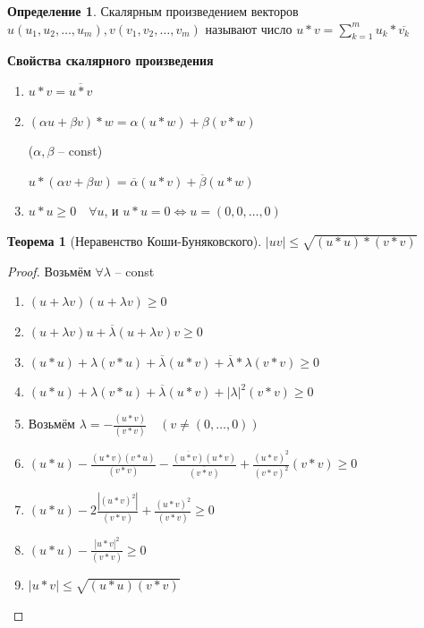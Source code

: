 \documentclass[a4paper,oneside]{article}
\newtheorem{theorem}{Теорема}[subsection]
\theoremstyle{definition}
\newtheorem{definition}{Определение}[subsection]
\theoremstyle{definition}
\theoremstyle{definition}
\begin{document}
\begin{definition}
    Скалярным произведением векторов $u(u_1, u_2, \dots, u_m), v(v_1, v_2, \dots, v_m)$
    называют число $u * v = \displaystyle\sum_{k = 1}^{m} u_k * \overline{v_k}$
\end{definition}

\textbf{Свойства скалярного произведения}
\begin{enumerate}
    \item $u * v = \overline{u * v}$
    \item $(\alpha u + \beta v) * w = \alpha (u * w) + \beta (v * w)$

    ($\alpha, \beta$ -- const)

    $u * (\alpha v + \beta w) = \overline{\alpha} (u * v) + \overline{\beta} (u * w)$

    \item $u * u \ge 0 \quad \forall u$, и $u * u = 0 \Leftrightarrow u = (0,0,\dots,0)$
\end{enumerate}

\begin{theorem}[Неравенство Коши-Буняковского]
    $|u v| \le \sqrt{(u * u) * (v * v)}$    
\end{theorem}

\begin{proof}
    Возьмём $\forall \lambda $ -- const

    \begin{enumerate}
        \item $(u + \lambda v) (u + \lambda v) \ge 0$
        \item $(u + \lambda v) u + \overline{\lambda} (u + \lambda v) v \ge 0$
        \item $(u * u) + \lambda (v * u) + \overline{\lambda} (u * v) + \overline{\lambda} * \lambda (v * v) \ge 0$
        \item $(u * u) + \lambda (v * u) + \overline{\lambda} (u * v) + |\lambda|^2 (v * v) \ge 0$
        \item Возьмём $\lambda = -\frac{(u * v)}{(v * v)} \quad (v \neq (0, \dots, 0))$
        \item $(u * u) - \frac{(u * v) (v * u)}{(v * v)} - \frac{\overline{(u * v)} (u * v)}{\overline{(v * v)}}
        + \frac{(u * v)^2}{(v * v)^2} (v * v) \ge 0$
        \item $(u * u) - 2 \frac{|(u * v)^2|}{(v * v)} + \frac{(u * v)^2}{(v * v)} \ge 0$
        \item $(u * u) - \frac{|u * v|^2}{(v * v)} \ge 0$
        \item $|u * v| \le \sqrt{(u * u) (v * v)}$
    \end{enumerate}
\end{proof}
\end{document}
